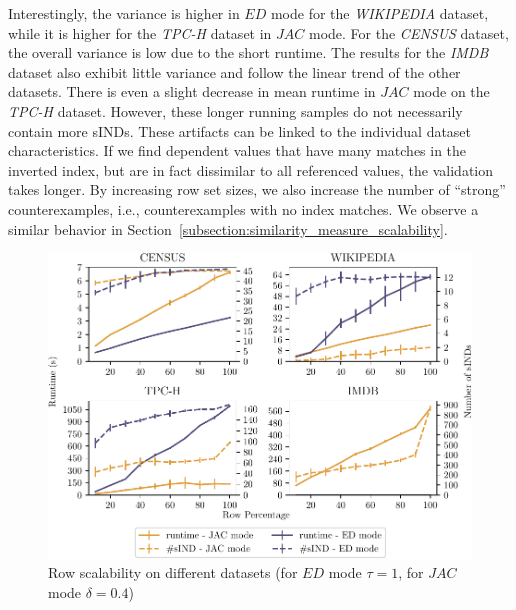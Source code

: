 Interestingly, the variance is higher in $ED$ mode for the \emph{WIKIPEDIA} dataset, while it is higher for the \emph{TPC-H} dataset in $JAC$ mode.
For the \emph{CENSUS} dataset, the overall variance is low due to the short runtime.
The results for the \emph{IMDB} dataset also exhibit little variance and follow the linear trend of the other datasets.
There is even a slight decrease in mean runtime in $JAC$ mode on the \emph{TPC-H} dataset.
However, these longer running samples do not necessarily contain more sINDs.
These artifacts can be linked to the individual dataset characteristics.
If we find dependent values that have many matches in the inverted index, but are in fact dissimilar to all referenced values, the validation takes longer.
By increasing row set sizes, we also increase the number of ``strong'' counterexamples, i.e., counterexamples with no index matches.
We observe a similar behavior in Section~\ref{subsection:similarity_measure_scalability}.


\begin{figure}[ht]
    \centering
    \includegraphics[width=.8\columnwidth]{figures/evaluation/row_scaling-crop.pdf}
    \caption{Row scalability on different datasets (for $ED$ mode $\tau = 1$, for $JAC$ mode $\delta = 0.4$)}
    \label{fig:eval:row}
\end{figure}

